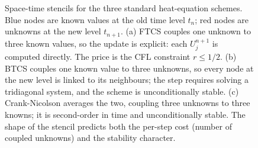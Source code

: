 \begin{figure}[htbp]
\begin{tikzpicture}
\end{tikzpicture}
\caption[Finite-difference stencils]{Space-time stencils for the
three standard heat-equation schemes. Blue nodes are known values
at the old time level $t_n$; red nodes are unknowns at the new
level $t_{n+1}$. (a) FTCS couples one unknown to three known values,
so the update is explicit: each $U_j^{n+1}$ is computed directly.
The price is the CFL constraint $r \le 1/2$. (b) BTCS couples one
known value to three unknowns, so every node at the new level is
linked to its neighbours; the step requires solving a tridiagonal
system, and the scheme is unconditionally stable. (c)
Crank-Nicolson averages the two, coupling three unknowns to three
knowns; it is second-order in time and unconditionally stable. The
shape of the stencil predicts both the per-step cost (number of
coupled unknowns) and the stability character.}
\label{fig:vol02:ch12:stencils}
\end{figure}
